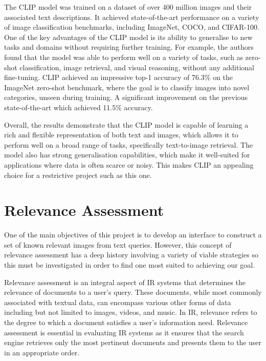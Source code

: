 \documentclass{l4proj}
\begin{document}
The CLIP model was trained on a dataset of over 400 million images and their associated text descriptions. It achieved state-of-the-art performance on a variety of image classification benchmarks, including ImageNet, COCO, and CIFAR-100. One of the key advantages of the CLIP model is its ability to generalise to new tasks and domains without requiring further training. For example, the authors found that the model was able to perform well on a variety of tasks, such as zero-shot classification, image retrieval, and visual reasoning, without any additional fine-tuning. CLIP achieved an impressive top-1 accuracy of 76.3\% on the ImageNet zero-shot benchmark, where the goal is to classify images into novel categories, unseen during training. A significant improvement on the previous state-of-the-art which achieved 11.5\% accuracy.

Overall, the results demonstrate that the CLIP model is capable of learning a rich and flexible representation of both text and images, which allows it to perform well on a broad range of tasks, specifically text-to-image retrieval. The model also has strong generalisation capabilities, which make it well-suited for applications where data is often scarce or noisy. This makes CLIP an appealing choice for a restrictive project such as this one.


\section{Relevance Assessment}
One of the main objectives of this project is to develop an interface to construct a set of known relevant images from text queries. However, this concept of relevance assessment has a deep history involving a variety of viable strategies so this must be investigated in order to find one most suited to achieving our goal.

Relevance assessment is an integral aspect of IR systems that determines the relevance of documents to a user's query. These documents, while most commonly associated with textual data, can encompass various other forms of data including but not limited to images, videos, and music. In IR, relevance refers to the degree to which a document satisfies a user's information need. Relevance assessment is essential in evaluating IR systems as it ensures that the search engine retrieves only the most pertinent documents and presents them to the user in an appropriate order.
\end{document}

